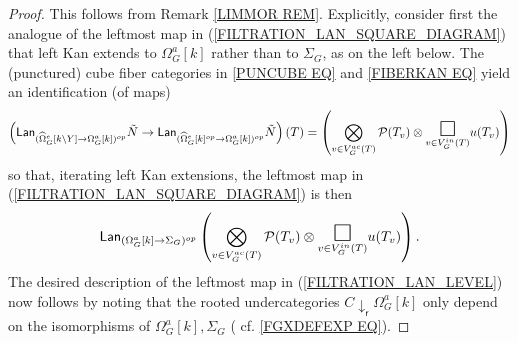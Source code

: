 \documentclass[a4paper,10pt
,draft
]{article}%
\numberwithin{equation}{section}
\numberwithin{figure}{section}
\theoremstyle{definition} %
\newcommand{\F}{\ensuremath{\mathcal F}}
\renewcommand{\P}{\ensuremath{\mathcal P}}
\newcommand{\1}{\ensuremath{\mathbbm 1}}%
\begin{document}
\begin{proof}
This follows from Remark \ref{LIMMOR REM}.
Explicitly,
consider first the analogue of the leftmost map in 
(\ref{FILTRATION_LAN_SQUARE_DIAGRAM}) 
that left Kan extends to 
$\Omega_G^a[k]$ rather than to $\Sigma_G$, as on the left below.
The (punctured) cube fiber categories in
\eqref{PUNCUBE EQ} and \eqref{FIBERKAN EQ} yield
an identification (of maps)
\[
\left(\mathsf{Lan}_{
	(\widehat{\Omega}_{G}^e[k \mathbin{\backslash} Y]
	\to \Omega^a_G[k])^{op}}\tilde{N}
	\to
\mathsf{Lan}_{
	(\widehat{\Omega}_{G}^e[k]^{op}
	\to \Omega^a_G[k])^{op}
	}\tilde{N}\right)(T)
=
\left(
	\bigotimes\limits_{v \in V_{G}^{ac}(T)}\P(T_v) \otimes
	\underset{v \in V_{G}^{in}(T)}
	{\mathlarger{\mathlarger{\mathlarger{\square}}}}
	u(T_v)
\right)
\]
so that, iterating left Kan extensions,
the leftmost map in 
(\ref{FILTRATION_LAN_SQUARE_DIAGRAM}) is then
\begin{equation}\label{FILTINTALT EQ}
	\mathsf{Lan}_{(\Omega_G^a[k] \to \Sigma_G)^{op}}
	\left(
		\bigotimes\limits_{v \in V_{G}^{ac}(T)}\P(T_v) \otimes
		\underset{v \in V_{G}^{in}(T)}
		{\mathlarger{\mathlarger{\mathlarger{\square}}}}
		u(T_v)
	\right).
\end{equation}
The desired description of the leftmost map in (\ref{FILTRATION_LAN_LEVEL})
now follows by noting that the rooted undercategories
$C \downarrow_{\mathsf{r}} \Omega_G^a[k]$
only depend on the isomorphisms 
of $\Omega_G^a[k],\Sigma_G$
(%
cf. \eqref{FGXDEFEXP EQ}).
\end{proof}



\renewcommand{\F}{\mathcal F}


\end{document}
